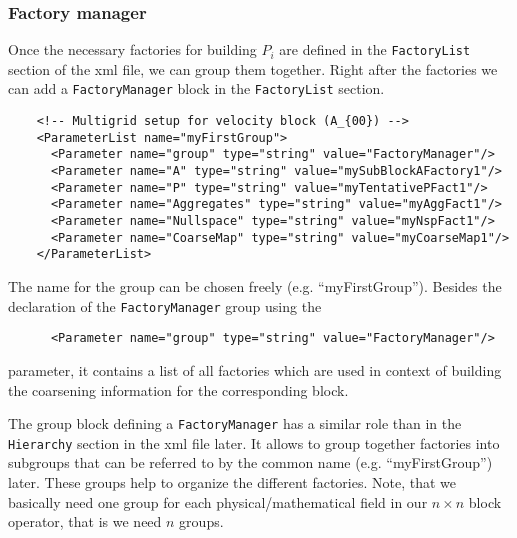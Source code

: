\documentclass[10pt,fleqn]{book}
\begin{document}
\subsubsection{Factory manager}
Once the necessary factories for building $P_i$ are defined in the \texttt{FactoryList} section of the xml file, we can group them together.  Right after the factories we can add a \texttt{FactoryManager} block in the \texttt{FactoryList} section.

\begin{lstlisting}
    <!-- Multigrid setup for velocity block (A_{00}) -->
    <ParameterList name="myFirstGroup">
      <Parameter name="group" type="string" value="FactoryManager"/>
      <Parameter name="A" type="string" value="mySubBlockAFactory1"/>
      <Parameter name="P" type="string" value="myTentativePFact1"/>
      <Parameter name="Aggregates" type="string" value="myAggFact1"/>
      <Parameter name="Nullspace" type="string" value="myNspFact1"/>
      <Parameter name="CoarseMap" type="string" value="myCoarseMap1"/>
    </ParameterList>
\end{lstlisting}

The name for the group can be chosen freely (e.g. ``myFirstGroup''). Besides the declaration of the \texttt{FactoryManager} group using the
\begin{lstlisting}
      <Parameter name="group" type="string" value="FactoryManager"/>
\end{lstlisting}
parameter, it contains a list of all factories which are used in context of building the coarsening information for the corresponding block.

The group block defining a \texttt{FactoryManager} has a similar role than in the \texttt{Hierarchy} section in the xml file later. It allows to group together factories into subgroups that can be referred to by the common name (e.g. ``myFirstGroup'') later. These groups help to organize the different factories. Note, that we basically need one group for each physical/mathematical field in our $n\times n$ block operator, that is we need $n$ groups.
\end{document}
